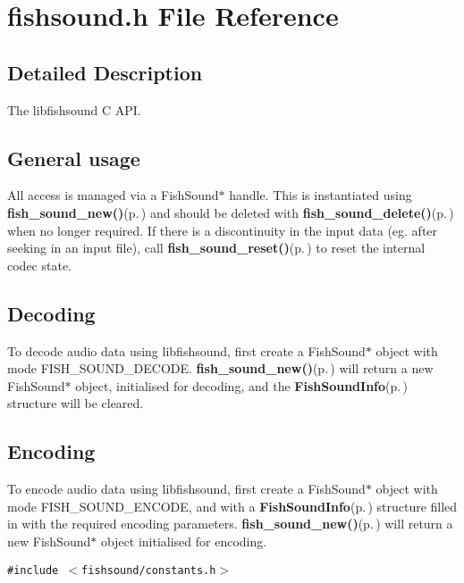 \section{fishsound.h File Reference}
\label{fishsound_8h}


\subsection{Detailed Description}
The libfishsound C API. 

\subsection{General usage}\label{general}
All access is managed via a Fish\-Sound$\ast$ handle. This is instantiated using {\bf fish\_\-sound\_\-new()}{\rm (p.\,\pageref{fishsound_8h_a4})} and should be deleted with {\bf fish\_\-sound\_\-delete()}{\rm (p.\,\pageref{fishsound_8h_a10})} when no longer required. If there is a discontinuity in the input data (eg. after seeking in an input file), call {\bf fish\_\-sound\_\-reset()}{\rm (p.\,\pageref{fishsound_8h_a9})} to reset the internal codec state.\subsection{Decoding}\label{decoding}
To decode audio data using libfishsound, first create a Fish\-Sound$\ast$ object with mode FISH\_\-SOUND\_\-DECODE. {\bf fish\_\-sound\_\-new()}{\rm (p.\,\pageref{fishsound_8h_a4})} will return a new Fish\-Sound$\ast$ object, initialised for decoding, and the {\bf Fish\-Sound\-Info}{\rm (p.\,\pageref{structFishSoundInfo})} structure will be cleared.\subsection{Encoding}\label{encoding}
To encode audio data using libfishsound, first create a Fish\-Sound$\ast$ object with mode FISH\_\-SOUND\_\-ENCODE, and with a {\bf Fish\-Sound\-Info}{\rm (p.\,\pageref{structFishSoundInfo})} structure filled in with the required encoding parameters. {\bf fish\_\-sound\_\-new()}{\rm (p.\,\pageref{fishsound_8h_a4})} will return a new Fish\-Sound$\ast$ object initialised for encoding.

{\tt \#include $<$fishsound/constants.h$>$}\par
